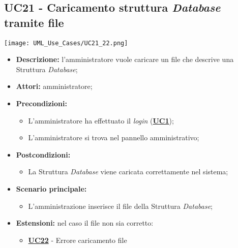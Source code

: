 \subsection{UC21 - Caricamento struttura \textit{Database} tramite file}
\label{sec:UC21}
\texttt{[image: UML\_Use\_Cases/UC21\_22.png]}
\begin{itemize}
	\item \textbf{Descrizione:} l’amministratore vuole caricare un file che descrive una Struttura \textit{Database};
	\item \textbf{Attori:} amministratore;
	\item \textbf{Precondizioni:} 
	\begin{itemize}
		\item L’amministratore ha effettuato il \textit{login} (\hyperref[sec:UC1]{\textbf{UC1}});
		\item L’amministratore si trova nel pannello amministrativo;
	\end{itemize}
	\item \textbf{Postcondizioni:} 
	\begin{itemize}
		\item La Struttura \textit{Database} viene caricata correttamente nel sistema;
	\end{itemize}
	\item \textbf{Scenario principale:} 
	\begin{itemize}
		\item L'amministrazione inserisce il file della Struttura \textit{Database};
	\end{itemize}
	\item \textbf{Estensioni:} nel caso il file non sia corretto:
	\begin{itemize}
		\item \hyperref[sec:UC22]{\textbf{UC22}} - Errore caricamento file
	\end{itemize}
\end{itemize}

